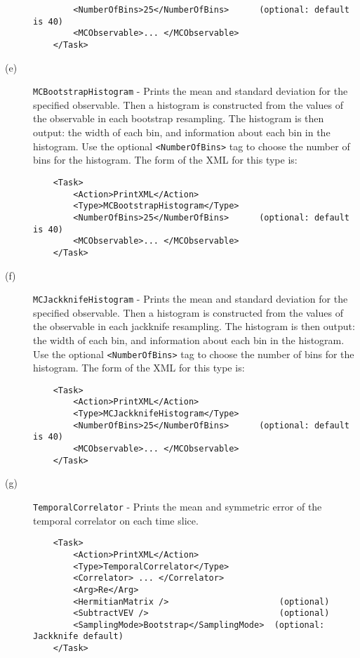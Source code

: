 \documentclass[12pt]{article}
\newcommand{\vb}{\texttt}
\begin{document}
\begin{description}
\begin{verbatim}
        <NumberOfBins>25</NumberOfBins>      (optional: default is 40)
        <MCObservable>... </MCObservable>
    </Task>
\end{verbatim}
\item[(e)] \vb{MCBootstrapHistogram} - Prints the mean and standard
  deviation for the specified observable.
  Then a histogram is constructed from the values of the observable in each bootstrap resampling.
  The histogram is then output: the width of each bin, and information about each bin in the histogram.
  Use the optional \vb{<NumberOfBins>} tag to choose the number of bins for the histogram.
  The form of the XML for this type is:
\begin{verbatim}
    <Task>
        <Action>PrintXML</Action>
        <Type>MCBootstrapHistogram</Type>
        <NumberOfBins>25</NumberOfBins>      (optional: default is 40)
        <MCObservable>... </MCObservable>
    </Task>
\end{verbatim}
\item[(f)] \vb{MCJackknifeHistogram} - Prints the mean and standard
  deviation for the specified observable.
  Then a histogram is constructed from the values of the observable in each jackknife resampling.
  The histogram is then output: the width of each bin, and information about each bin in the histogram.
  Use the optional \vb{<NumberOfBins>} tag to choose the number of bins for the histogram.
  The form of the XML for this type is:
\begin{verbatim}
    <Task>
        <Action>PrintXML</Action>
        <Type>MCJackknifeHistogram</Type>
        <NumberOfBins>25</NumberOfBins>      (optional: default is 40)
        <MCObservable>... </MCObservable>
    </Task>
\end{verbatim}
\item[(g)] \vb{TemporalCorrelator} - Prints the mean and symmetric error
of the temporal correlator on each time slice.
\begin{verbatim}
    <Task>
        <Action>PrintXML</Action>
        <Type>TemporalCorrelator</Type>
        <Correlator> ... </Correlator>
        <Arg>Re</Arg>
        <HermitianMatrix />                      (optional)
        <SubtractVEV />                          (optional)
        <SamplingMode>Bootstrap</SamplingMode>  (optional: Jackknife default)
    </Task>
\end{verbatim}


\end{description}
\end{document}
